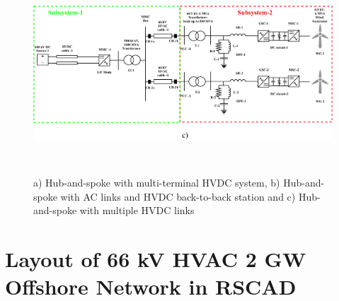 \begin{figure}[H]
\centering
    \includegraphics[height = 7.5cm,width = 16cm]{Diagrams/Chapter_4/WT4_Scaling.pdf}
    \caption{a) Hub-and-spoke with multi-terminal HVDC system, b) Hub-and-spoke with AC links and HVDC back-to-back station and c) Hub-and-spoke with multiple HVDC links \cite{abb_hvdc_2018}}
    \label{fig:ABB_Hub_Spoke_3}
\end{figure}



\section{Layout of 66 kV HVAC 2 GW Offshore Network in RSCAD}


